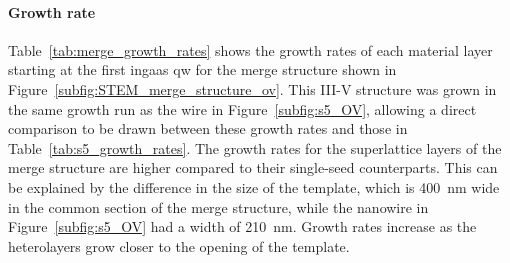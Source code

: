 \paragraph{Growth rate} Table~\ref{tab:merge_growth_rates} shows the growth rates of each material layer starting at the first \acs{ingaas} \acl{qw} for the merge structure shown in Figure~\ref{subfig:STEM_merge_structure_ov}. This III-V structure was grown in the same growth run as the wire in Figure~\ref{subfig:s5_OV}, allowing a direct comparison to be drawn between these growth rates and those in Table~\ref{tab:s5_growth_rates}. The growth rates for the superlattice layers of the merge structure are higher compared to their single-seed counterparts. This can be explained by the difference in the size of the template, which is \qty{400}{\nano\metre} wide in the common section of the merge structure, while the nanowire in Figure~\ref{subfig:s5_OV} had a width of \qty{210}{\nano\metre}. Growth rates increase as the heterolayers grow closer to the opening of the template.


